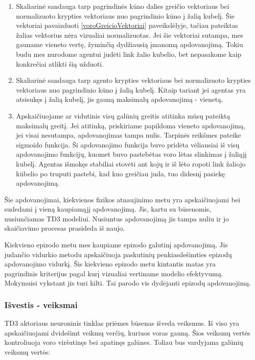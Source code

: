 \documentclass[a4paper, 12pt]{article}
\begin{document}
\begin{enumerate}
  \addtolength{\itemsep}{-0.5\baselineskip} 
  \item Skaliarinė sandauga tarp pagrindinės kūno dalies greičio vektoriaus bei normalizuoto krypties vektoriaus nuo pagrindinio kūno į žalią kubelį. Šie vektoriai pavaizduoti \ref{voroGreicioVektoriai} paveikslėlyje, tačiau pateiktas žalias vektorius nėra vizualiai normalizuotas. Jei šie vektoriai sutampa, mes gauname vieneto vertę, žyminčią dydžiausią įmanomą apdovanojimą. Tokiu budu mes nurodome agentui judėti link žalio kubelio, bet nepasakome kaip konkrečiai atlikti šią užduoti.
  \item Skaliarinė sandauga tarp agento krypties vektoriaus bei normalizuoto krypties vektoriaus nuo pagrindinio kūno į žalią kubelį. Kitaip tariant jei agentas yra atsisukęs į žalią kubelį, jis gauną maksimalų apdovanojimą - vienetą.
  \item Apskaičiuojame ar vidutinis visų galūnių greitis atitinka mūsų pateiktą maksimalų greitį. Jei atitinką, priskiriame papildoma vieneto apdovanojimą, jei visai nesutampa, apdovanojimas tampa nulis. Tarpinės reikšmes pateike sigmoido funkcija. Ši apdovanojimo funkcija buvo pridėta vėliausiai iš visų apdovanojimo funkcijų, kuomet buvo pastebėtas voro lėtas slinkimas į žaliąjį kubelį. Agentas išmokęs stabiliai stovėti ant kojų ir iš lėto ropoti link žaliojo kūbelio po truputi pastebi, kad kuo greičiau juda, tuo didesnį pasiekę apdovanojimą. 
\end{enumerate}

Šie apdovanojimai, kiekvienos fizikos atnaujinimo metu yra apskaičiuojami bei sudedami į vieną kaupiamąjį apdovanojimą. Jis, kartu su būsenomis, nusiunčiamas TD3 modeliui. Nusiuntus apdovanojimą jis tampa nuliu ir jo skaičiavimo procesas prasideda iš naujo.

Kiekvieno epizodo metu mes kaupiame epizodo galutinį apdovanojimą. Jis judančio vidurkio metodu apskaičiuoja paskutinių penkiasdešimties epizodų apdovanojimo vidurkį. Šis kiekvieno epizodo metu kintantis matas yra pagrindinis kriterijus pagal kurį vizualiai vertiname modelio efektyvumą. Mokymuisi vykstant jis turi kilti. Tai parodo vis dydėjanti epizodų apdovanojimą.

\subsubsection{Išvestis - veiksmai}

TD3 aktoriaus neuroninis tinklas priėmes būsenas išveda veiksmus. Iš viso yra apskaičiuojami dvidešimt veikmų verčių, kuriuos voras gauną. Šios veiksmų vertės kontroliuoja voro viršutinęs bei apatinęs galūnes. Toliau bus vardyjama galūnių veiksmų vertės:
\end{document}
